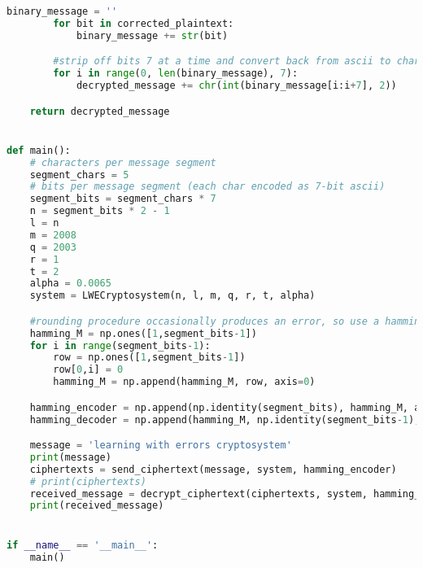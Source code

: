 \begin{lstlisting}[language=Python]
        binary_message = ''
        for bit in corrected_plaintext:
            binary_message += str(bit)

        #strip off bits 7 at a time and convert back from ascii to characters
        for i in range(0, len(binary_message), 7):
            decrypted_message += chr(int(binary_message[i:i+7], 2))

    return decrypted_message


def main():
    # characters per message segment
    segment_chars = 5
    # bits per message segment (each char encoded as 7-bit ascii)
    segment_bits = segment_chars * 7
    n = segment_bits * 2 - 1
    l = n
    m = 2008
    q = 2003
    r = 1
    t = 2
    alpha = 0.0065
    system = LWECryptosystem(n, l, m, q, r, t, alpha)

    #rounding procedure occasionally produces an error, so use a hamming code
    hamming_M = np.ones([1,segment_bits-1])
    for i in range(segment_bits-1):
        row = np.ones([1,segment_bits-1])
        row[0,i] = 0
        hamming_M = np.append(hamming_M, row, axis=0)

    hamming_encoder = np.append(np.identity(segment_bits), hamming_M, axis=1)
    hamming_decoder = np.append(hamming_M, np.identity(segment_bits-1), axis=0)

    message = 'learning with errors cryptosystem'
    print(message)
    ciphertexts = send_ciphertext(message, system, hamming_encoder)
    # print(ciphertexts)
    received_message = decrypt_ciphertext(ciphertexts, system, hamming_decoder)
    print(received_message)


if __name__ == '__main__':
    main()
\end{lstlisting}
